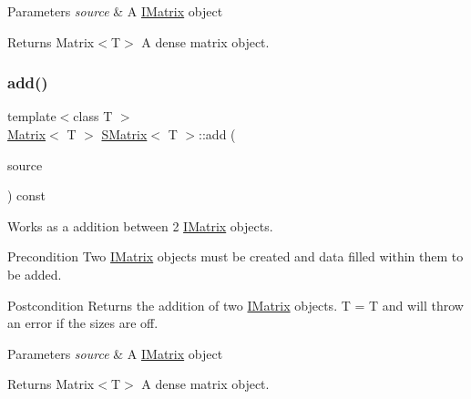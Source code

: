 \begin{DoxyParams}{Parameters}
{\em source} & A \mbox{\hyperlink{class_i_matrix}{I\+Matrix}} object \\
\hline
\end{DoxyParams}
\begin{DoxyReturn}{Returns}
Matrix$<$\+T$>$ A dense matrix object. 
\end{DoxyReturn}
\mbox{\label{class_s_matrix_a573a5ccc8c40e1fce3e7f77cd5b2cfde}} 
\subsubsection{\texorpdfstring{add()}{add()}\hspace{0.1cm}{\footnotesize\ttfamily [2/6]}}
{\footnotesize\ttfamily template$<$class T $>$ \\
\mbox{\hyperlink{class_matrix}{Matrix}}$<$ T $>$ \mbox{\hyperlink{class_s_matrix}{S\+Matrix}}$<$ T $>$\+::add (\begin{DoxyParamCaption}\item[{const \mbox{\hyperlink{class_i_matrix}{I\+Matrix}}$<$ \mbox{\hyperlink{class_t_matrix}{T\+Matrix}}$<$ T $>$, T $>$ \&}]{source }\end{DoxyParamCaption}) const}



Works as a addition between 2 \mbox{\hyperlink{class_i_matrix}{I\+Matrix}} objects. 

\begin{DoxyPrecond}{Precondition}
Two \mbox{\hyperlink{class_i_matrix}{I\+Matrix}} objects must be created and data filled within them to be added. 
\end{DoxyPrecond}
\begin{DoxyPostcond}{Postcondition}
Returns the addition of two \mbox{\hyperlink{class_i_matrix}{I\+Matrix}} objects. T = T and will throw an error if the sizes are off.
\end{DoxyPostcond}

\begin{DoxyParams}{Parameters}
{\em source} & A \mbox{\hyperlink{class_i_matrix}{I\+Matrix}} object \\
\hline
\end{DoxyParams}
\begin{DoxyReturn}{Returns}
Matrix$<$\+T$>$ A dense matrix object. 
\end{DoxyReturn}
\mbox{\label{class_s_matrix_a3d6d2c3775503773d138f646fe3e67f7}} 
